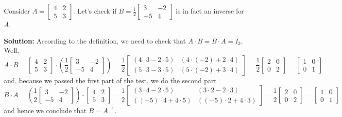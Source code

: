 \begin{example}Consider $A=\left[\begin{array}{rr} 4 & 2 \\ 5 & 3\end{array} \right]$. Let's check if $B=\frac{1}{2}\left[\begin{array}{rr} 3 & -2\\ -5 & 4 \end{array} \right]$ is in fact an inverse for $A$.
\end{example} 

\noindent \textbf{Solution:} According to the definition, we need to check that $A\cdot B = B \cdot A = I_2$. Well, 
$$A \cdot B = \left[\begin{array}{rr} 4 & 2 \\ 5 & 3\end{array} \right] \cdot \left( \frac{1}{2}\left[\begin{array}{rr} 3 & -2\\ -5 & 4 \end{array} \right] \right)= \frac{1}{2} \left[\begin{array}{rr} \left(4 \cdot 3 - 2 \cdot 5\right) & \left(4 \cdot(-2)+ 2 \cdot 4\right)\\  \left(5 \cdot 3 - 3 \cdot 5\right) & \left(5 \cdot(-2)+ 3 \cdot 4\right)\end{array} \right] = \frac{1}{2}\left[\begin{array}{rr} 2 & 0\\ 0 & 2 \end{array} \right] = \left[\begin{array}{rr} 1 & 0\\ 0 & 1 \end{array} \right]$$
and, because we passed the first part of the test, we do the second part
$$B \cdot A =  \left( \frac{1}{2}\left[\begin{array}{rr} 3 & -2\\ -5 & 4 \end{array} \right] \right) \cdot \left[\begin{array}{rr} 4 & 2 \\ 5 & 3\end{array} \right] = 
\frac{1}{2} \left[\begin{array}{rr} \left(3 \cdot 4 - 2 \cdot 5\right) & \left(3 \cdot 2 -2 \cdot 3\right)\\  \left((-5) \cdot 4 +4 \cdot 5\right) & \left((-5) \cdot 2+ 4 \cdot 3\right)\end{array} \right] = \frac{1}{2}\left[\begin{array}{rr} 2 & 0\\ 0 & 2 \end{array} \right] = 
\left[\begin{array}{rr} 1 & 0\\ 0 & 1 \end{array} \right]$$
and hence we conclude that $B=A^{-1}.$  \Qed\\

